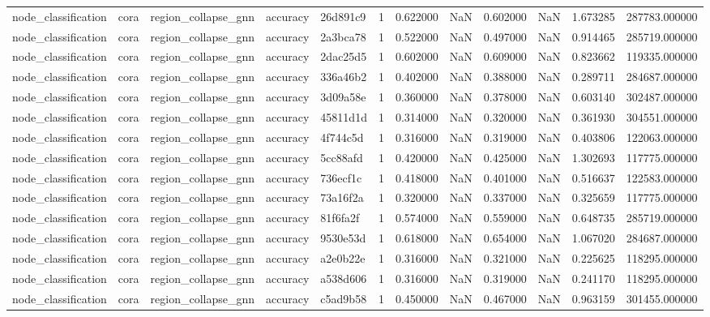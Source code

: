 \begin{tabular}{lllllrrrrrrr}
node_classification & cora & region_collapse_gnn & accuracy & 26d891c9 & 1 & 0.622000 & NaN & 0.602000 & NaN & 1.673285 & 287783.000000 \\
node_classification & cora & region_collapse_gnn & accuracy & 2a3bca78 & 1 & 0.522000 & NaN & 0.497000 & NaN & 0.914465 & 285719.000000 \\
node_classification & cora & region_collapse_gnn & accuracy & 2dac25d5 & 1 & 0.602000 & NaN & 0.609000 & NaN & 0.823662 & 119335.000000 \\
node_classification & cora & region_collapse_gnn & accuracy & 336a46b2 & 1 & 0.402000 & NaN & 0.388000 & NaN & 0.289711 & 284687.000000 \\
node_classification & cora & region_collapse_gnn & accuracy & 3d09a58e & 1 & 0.360000 & NaN & 0.378000 & NaN & 0.603140 & 302487.000000 \\
node_classification & cora & region_collapse_gnn & accuracy & 45811d1d & 1 & 0.314000 & NaN & 0.320000 & NaN & 0.361930 & 304551.000000 \\
node_classification & cora & region_collapse_gnn & accuracy & 4f744c5d & 1 & 0.316000 & NaN & 0.319000 & NaN & 0.403806 & 122063.000000 \\
node_classification & cora & region_collapse_gnn & accuracy & 5cc88afd & 1 & 0.420000 & NaN & 0.425000 & NaN & 1.302693 & 117775.000000 \\
node_classification & cora & region_collapse_gnn & accuracy & 736ecf1c & 1 & 0.418000 & NaN & 0.401000 & NaN & 0.516637 & 122583.000000 \\
node_classification & cora & region_collapse_gnn & accuracy & 73a16f2a & 1 & 0.320000 & NaN & 0.337000 & NaN & 0.325659 & 117775.000000 \\
node_classification & cora & region_collapse_gnn & accuracy & 81f6fa2f & 1 & 0.574000 & NaN & 0.559000 & NaN & 0.648735 & 285719.000000 \\
node_classification & cora & region_collapse_gnn & accuracy & 9530e53d & 1 & 0.618000 & NaN & 0.654000 & NaN & 1.067020 & 284687.000000 \\
node_classification & cora & region_collapse_gnn & accuracy & a2e0b22e & 1 & 0.316000 & NaN & 0.321000 & NaN & 0.225625 & 118295.000000 \\
node_classification & cora & region_collapse_gnn & accuracy & a538d606 & 1 & 0.316000 & NaN & 0.319000 & NaN & 0.241170 & 118295.000000 \\
node_classification & cora & region_collapse_gnn & accuracy & c5ad9b58 & 1 & 0.450000 & NaN & 0.467000 & NaN & 0.963159 & 301455.000000 \\

\end{tabular}
